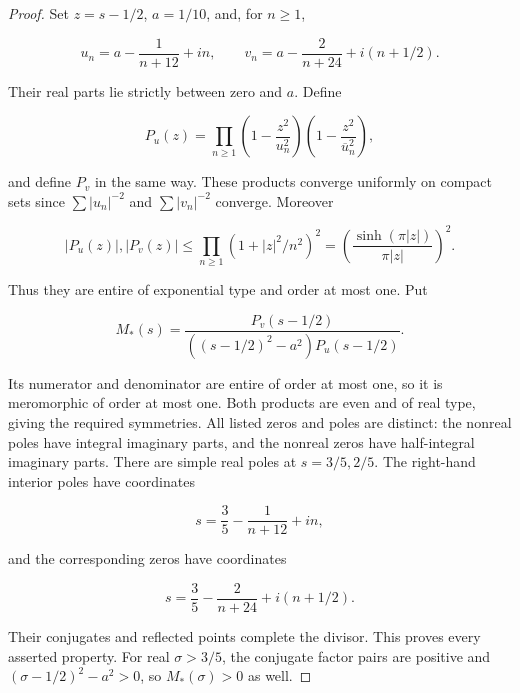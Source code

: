 \begin{proof} Set \(z=s-1/2\), \(a=1/10\), and, for \(n\ge1\),

\begin{equation}\label{eq:ob6-1}
u_n=a-\frac1{n+12}+in,\qquad
v_n=a-\frac2{n+24}+i(n+1/2).
\end{equation}

Their real parts lie strictly between zero and \(a\). Define

\begin{equation}\label{eq:ob6-2}
P_u(z)=\prod_{n\ge1}
\left(1-\frac{z^2}{u_n^2}\right)
\left(1-\frac{z^2}{\overline u_n^2}\right),
\end{equation}

and define \(P_v\) in the same way. These products converge uniformly on compact sets since \(\sum|u_n|^{-2}\) and \(\sum|v_n|^{-2}\) converge. Moreover

\begin{equation}\label{eq:ob6-3}
|P_u(z)|, |P_v(z)|
\le\prod_{n\ge1}(1+|z|^2/n^2)^2
=\left(\frac{\sinh(\pi|z|)}{\pi|z|}\right)^2.
\end{equation}

Thus they are entire of exponential type and order at most one. Put

\begin{equation}\label{eq:ob6-4}
M_*(s)=
\frac{P_v(s-1/2)}{
((s-1/2)^2-a^2)P_u(s-1/2)}.
\end{equation}

Its numerator and denominator are entire of order at most one, so it is meromorphic of order at most one. Both products are even and of real type, giving the required symmetries. All listed zeros and poles are distinct: the nonreal poles have integral imaginary parts, and the nonreal zeros have half-integral imaginary parts. There are simple real poles at \(s=3/5,2/5\). The right-hand interior poles have coordinates

\begin{equation}\label{eq:ob6-5}
s=\frac35-\frac1{n+12}+in,
\end{equation}

and the corresponding zeros have coordinates

\begin{equation}\label{eq:ob6-6}
s=\frac35-\frac2{n+24}+i(n+1/2).
\end{equation}

Their conjugates and reflected points complete the divisor. This proves every asserted property. For real \(\sigma>3/5\), the conjugate factor pairs are positive and \((\sigma-1/2)^2-a^2>0\), so \(M_*(\sigma)>0\) as well. \end{proof}


